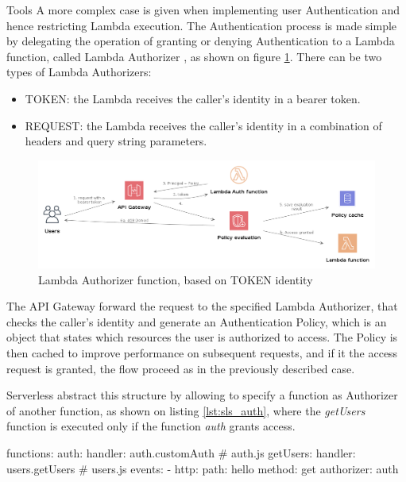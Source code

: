 \begin{chapter}{Tools}
    A more complex case is given when implementing user Authentication and hence
    restricting Lambda execution. The Authentication process is made simple by
    delegating the operation of granting or denying Authentication to a Lambda
    function, called Lambda Authorizer \cite{aws_api_gateway_doc}, as shown on
    figure \ref{fig:lambda_with_auth}. There can be two types of Lambda Authorizers:
    \begin{itemize}
        \item TOKEN: the Lambda receives the caller's identity in a bearer token.
        \item REQUEST: the Lambda receives the caller's identity in a combination
            of headers and query string parameters.
    \end{itemize}

    \begin{figure}
        \centering
        \includegraphics[width=\linewidth]{source/diagrams/lambda_authorizer.png}
        \caption{Lambda Authorizer function, based on TOKEN identity}
        \label{fig:lambda_with_auth}
    \end{figure}

    The API Gateway forward the request to the specified Lambda Authorizer, that
    checks the caller's identity and generate an Authentication Policy, which is
    an object that states which resources the user is authorized to access.
    The Policy is then cached to improve performance on subsequent requests, and
    if it the access request is granted, the flow proceed as in the previously
    described case.

    Serverless abstract this structure by allowing to specify a function as
    Authorizer of another function, as shown on listing \ref{lst:sls_auth}, where
    the \textit{getUsers} function is executed only if the function \textit{auth}
    grants access.

    \bigskip
    \begin{code}[caption=Authorizer definition on Serverless, label={lst:sls_auth}]
functions:
  auth:
    handler: auth.customAuth  # auth.js
  getUsers:
    handler: users.getUsers   # users.js
    events:
      - http:
        path: hello
        method: get
        authorizer: auth
    \end{code}


\end{chapter}
